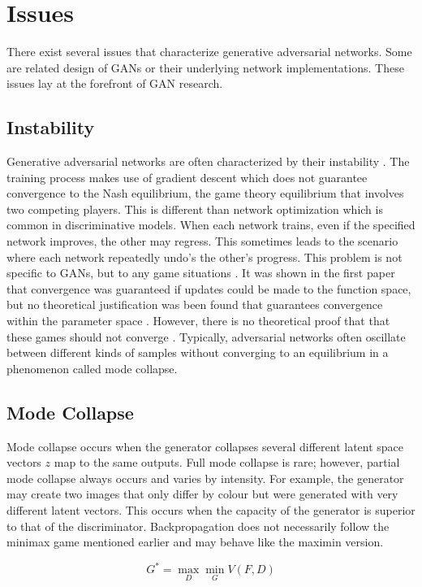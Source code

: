 \documentclass[11pt]{article}
\begin{document}
\section{Issues}
There exist several issues that characterize generative adversarial networks. Some are related design of GANs or their underlying network implementations. These issues lay at the forefront of GAN research.

\subsection{Instability}
Generative adversarial networks are often characterized by their instability \citep{2017arXiv170100160G}. The training process makes use of gradient descent which does not guarantee convergence to the Nash equilibrium, the game theory equilibrium that involves two competing players. This is different than network optimization which is common in discriminative models. When each network trains, even if the specified network improves, the other may regress. This sometimes leads to the scenario where each network repeatedly undo's the other's progress. This problem is not specific to GANs, but to any game situations \citep{2017arXiv170100160G}. It was shown in the first paper that convergence was guaranteed if updates could be made to the function space, but no theoretical justification was been found that guarantees convergence within the parameter space \citep{2014arXiv1406.2661G}. However, there is no theoretical proof that that these games should not converge \citep{2017arXiv170100160G}. Typically, adversarial networks often oscillate between different kinds of samples without converging to an equilibrium in a phenomenon called mode collapse.

\subsection{Mode Collapse}
Mode collapse occurs when the generator collapses several different latent space vectors $z$ map to the same outputs. Full mode collapse is rare; however, partial mode collapse always occurs and varies by intensity. For example, the generator may create two images that only differ by colour but were generated with very different latent vectors. This occurs when the capacity of the generator is superior to that of the discriminator. Backpropagation does not necessarily follow the minimax game mentioned earlier and may behave like the maximin version.

$$G^* = \max_{D}\min_{G}V(F, D)$$
\end{document}
